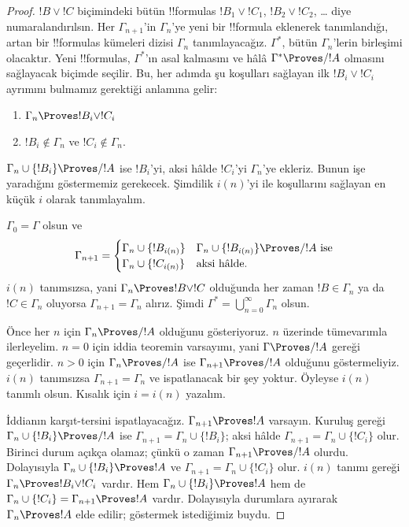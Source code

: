 \documentclass[../../../include/open-logic-section]{subfiles}
\begin{document}
\begin{proof}
  $!B\lor !C$ biçimindeki bütün !!{formula}s
  $!B_1\lor !C_1$, $!B_2\lor !C_2$, \dots{} diye numaralandırılsın. Her
  $\Gamma_{n+1}$'in $\Gamma_n$'ye yeni bir !!{formula} eklenerek
  tanımlandığı, artan bir !!{formula}s kümeleri dizisi $\Gamma_n$
  tanımlayacağız. $\Gamma^*$, bütün $\Gamma_n$'lerin birleşimi olacaktır.
  Yeni !!{formula}s, $\Gamma^*$'ın asal kalmasını ve hâlâ
  $\Gamma^*\Proves/ !A$ olmasını sağlayacak biçimde seçilir. Bu, her adımda
  şu koşulları sağlayan ilk $!B_i\lor !C_i$ ayrımını bulmamız gerektiği
  anlamına gelir:
  \begin{enumerate}
  \item{} $\Gamma_n \Proves !B_i \lor !C_i$
  \item{} $!B_i \notin \Gamma_n$ ve
    $!C_i \notin \Gamma_n$.
  \end{enumerate}
  $\Gamma_n\cup\{!B_i\}\Proves/ !A$ ise $!B_i$'yi, aksi hâlde $!C_i$'yi
  $\Gamma_n$'ye ekleriz. Bunun işe yaradığını göstermemiz gerekecek.
  Şimdilik $i(n)$'yi  ile  koşullarını
  sağlayan en küçük $i$ olarak tanımlayalım.

  $\Gamma_0=\Gamma$ olsun ve
  \[
  \Gamma_{n+1} = \begin{cases}
    \Gamma_n \cup \{!B_{i(n)}\} &
    \text{$\Gamma_n \cup \{!B_{i(n)}\} \Proves/ !A$ ise} \\
    \Gamma_n \cup \{!C_{i(n)}\} & \text{aksi hâlde.}
    \end{cases}
  \]
  $i(n)$ tanımsızsa, yani $\Gamma_n\Proves !B\lor !C$ olduğunda her zaman
  $!B\in\Gamma_n$ ya da $!C\in\Gamma_n$ oluyorsa
  $\Gamma_{n+1}=\Gamma_n$ alırız. Şimdi
  $\Gamma^*=\bigcup_{n=0}^{\infty}\Gamma_n$ olsun.

  Önce her $n$ için $\Gamma_n\Proves/ !A$ olduğunu gösteriyoruz. $n$
  üzerinde tümevarımla ilerleyelim. $n=0$ için iddia teoremin varsayımı,
  yani $\Gamma\Proves/ !A$ gereği geçerlidir. $n>0$ için
  $\Gamma_n\Proves/ !A$ ise $\Gamma_{n+1}\Proves/ !A$ olduğunu
  göstermeliyiz. $i(n)$ tanımsızsa $\Gamma_{n+1}=\Gamma_n$ ve
  ispatlanacak bir şey yoktur. Öyleyse $i(n)$ tanımlı olsun. Kısalık için
  $i=i(n)$ yazalım.

  İddianın karşıt-tersini ispatlayacağız. $\Gamma_{n+1}\Proves !A$
  varsayın. Kuruluş gereği $\Gamma_n\cup\{!B_i\}\Proves/ !A$ ise
  $\Gamma_{n+1}=\Gamma_n\cup\{!B_i\}$; aksi hâlde
  $\Gamma_{n+1}=\Gamma_n\cup\{!C_i\}$ olur. Birinci durum açıkça olamaz;
  çünkü o zaman $\Gamma_{n+1}\Proves/ !A$ olurdu. Dolayısıyla
  $\Gamma_n\cup\{!B_i\}\Proves !A$ ve
  $\Gamma_{n+1}=\Gamma_n\cup\{!C_i\}$ olur. $i(n)$ tanımı gereği
  $\Gamma_n\Proves !B_i\lor !C_i$ vardır. Hem
  $\Gamma_n\cup\{!B_i\}\Proves !A$ hem de
  $\Gamma_n\cup\{!C_i\}=\Gamma_{n+1}\Proves !A$ vardır. Dolayısıyla
  durumlara ayırarak $\Gamma_n\Proves !A$ elde edilir; göstermek
  istediğimiz buydu.


\end{proof}
\end{document}
